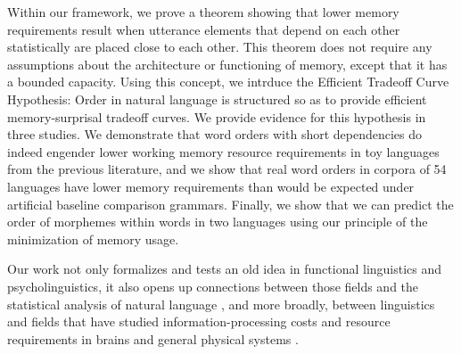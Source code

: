 Within our framework, we prove a theorem showing that lower memory requirements result when utterance elements that depend on each other statistically are placed close to each other. This theorem does not require any assumptions about the architecture or functioning of memory, except that it has a bounded capacity.
Using this concept, we intrduce the Efficient Tradeoff Curve Hypothesis: Order in natural language is structured so as to provide efficient memory-surprisal tradeoff curves.
We provide evidence for this hypothesis in three studies.
We demonstrate that word orders with short dependencies do indeed engender lower working memory resource requirements in toy languages from the previous literature, and we show that real word orders in corpora of 54 languages have lower memory requirements than would be expected under artificial baseline comparison grammars. Finally, we show that we can predict the order of morphemes within words in two languages using our principle of the minimization of memory usage.



Our work not only formalizes and tests an old idea in functional linguistics and psycholinguistics, it also opens up connections between those fields and the statistical analysis of natural language \citep{debowski-excess-2011,bentz2017word,lin-critical-2017}, and more broadly, between linguistics and fields that have studied information-processing costs and resource requirements in brains \citep{friston2010free} and general physical systems \citep{still2012thermodynamic}. 





